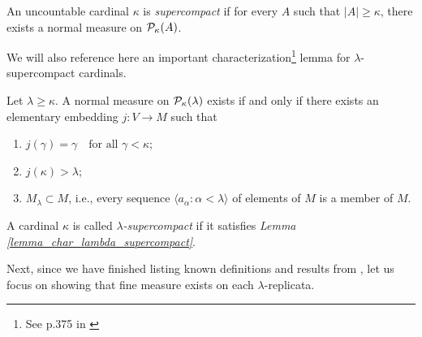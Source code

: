 \begin{definition}\label{def_supercompact_cardinal}
    An uncountable cardinal \( \kappa \) is \emph{supercompact} if for every \( A \) such that \( |A| \geq \kappa \), there exists a normal measure on \( \mathcal{P}_{\kappa}(A) \).
\end{definition}

We will also reference here an important characterization\footnote{See p.375 in \cite{jech2003set}} lemma for $\lambda$-supercompact cardinals.

\begin{lemma}\label{lemma_char_lambda_supercompact}
    Let $\lambda \geq \kappa$. A normal measure on $\mathcal{P}_\kappa(\lambda)$ exists if and only if there exists an elementary embedding $j : V \to M$ such that
        \begin{enumerate}[label=(\roman*)]
            \item $j(\gamma) = \gamma \quad \text{for all } \gamma < \kappa$;
            \item $j(\kappa) > \lambda$;
            \item $M_\lambda \subset M$, i.e., every sequence $\langle a_\alpha : \alpha < \lambda \rangle$ of elements of $M$ is a member of $M$.
        \end{enumerate}
\end{lemma}

A cardinal $\kappa$ is called \emph{$\lambda$-supercompact} if it satisfies \textit{Lemma \ref{lemma_char_lambda_supercompact}}.

Next, since we have finished listing known definitions and results from \cite{jech2003set}, let us focus on showing that fine measure exists on each $\lambda$-replicata.

